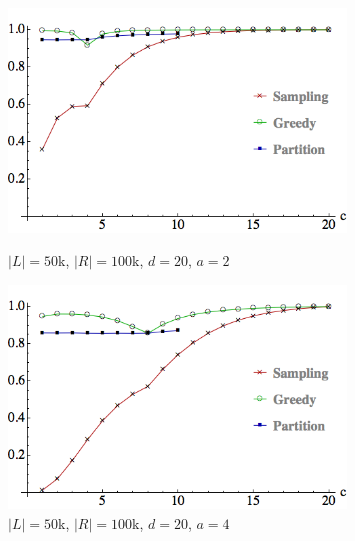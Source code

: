\begin{figure}[t]
\centering
\begin{minipage}[h]{0.48\textwidth}
\centering
\includegraphics[width=0.8\textwidth]{images/l=50000,r=100000,a=2_Greedy_vs_Naive.png}
\caption{$|L|=50$k, $|R|=100$k, $d=20$, $a=2$}\label{fig:a=2}
\end{minipage}
\hspace{0cm}
\begin{minipage}[h]{0.48\textwidth}
\centering
\includegraphics[width=0.8\textwidth]{images/l=50000,r=100000,a=4_Greedy_vs_Naive.png}
\caption{$|L|=50$k, $|R|=100$k, $d=20$, $a=4$}\label{fig:a=4}
\end{minipage}
\vspace{-0.2in}
\end{figure}
